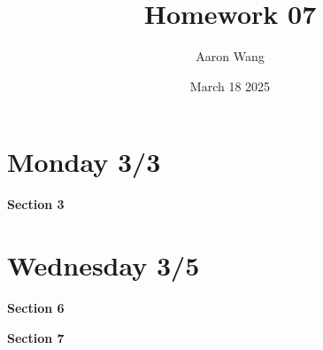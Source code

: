 \documentclass{article}
\title{Homework 07}
\author{Aaron Wang}
\date{March 18 2025}
\begin{document}
\maketitle
\section{Monday 3/3}
\begin{large}
 \textbf{Section 3}   
\end{large}
\begin{enumerate}
    
    
    
    
    
    
    
    
\end{enumerate}
\newpage
\section{Wednesday 3/5}
\begin{large}
 \textbf{Section 6}   
\end{large}
\begin{enumerate}
    
\end{enumerate}
\begin{large}
 \textbf{Section 7}   
\end{large}
\begin{enumerate}
    
    
    
    
\end{enumerate}
\end{document}
